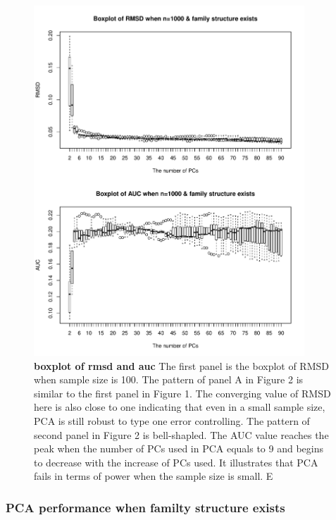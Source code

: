 \documentclass[12pt]{article}
\begin{document}
\begin{figure}[bp!]
  \centering
  \includegraphics[width=4in]{PCA_n_1000_m_100_family_structure.pdf}
  \caption{
    {\bf boxplot of rmsd and auc}
    The first panel is the boxplot of RMSD when sample size is 100. The pattern of panel A in Figure 2 is similar to the first panel in Figure 1. The converging value of RMSD here is also close to one indicating that even in a small sample size, PCA is still robust to type one error controlling. The pattern of second panel in Figure 2 is bell-shapled. The AUC value reaches the peak when the number of PCs used in PCA equals to 9 and begins to decrease with the increase of PCs used. It illustrates that PCA fails in terms of power when the sample size is small. E}
  \label{fig:example}
\end{figure}

\subsubsection{PCA performance when familty structure exists}
\end{document}
